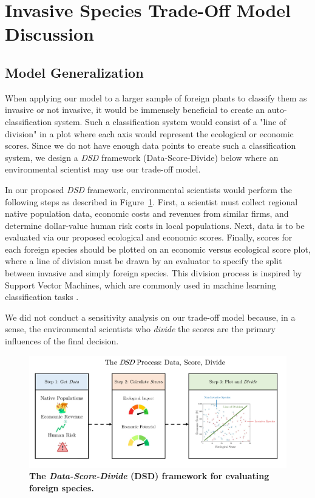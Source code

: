 \section{Invasive Species Trade-Off Model Discussion}

\subsection{Model Generalization}

When applying our model to a larger sample of foreign plants to classify them as invasive or not invasive, it would be immensely beneficial to create an auto-classification system. Such a classification system would consist of a "line of division" in a plot where each axis would represent the ecological or economic scores. Since we do not have enough data points to create such a classification system, we design a \textit{DSD} framework (Data-Score-Divide) below where an environmental scientist may use our trade-off model.

In our proposed \textit{DSD} framework, environmental scientists would perform the following steps as described in Figure~\ref{fig:dsdprocess}. First, a scientist must collect regional native population data, economic costs and revenues from similar firms, and determine dollar-value human risk costs in local populations. Next, data is to be evaluated via our proposed ecological and economic scores. Finally, scores for each foreign species should be plotted on an economic versus ecological score plot, where a line of division must be drawn by an evaluator to specify the split between invasive and simply foreign species. This division process is inspired by Support Vector Machines, which are commonly used in machine learning classification tasks \cite{ieeeSupportVector}.

We did not conduct a sensitivity analysis on our trade-off model because, in a sense, the environmental scientists who \textit{divide} the scores are the primary influences of the final decision.

\begin{figure}[h!]
\centering
    \includegraphics[scale=0.6]{figures/dsdprocess.pdf}
    \captionsetup{width=0.9\textwidth}
    \caption{\textbf{The \textit{Data-Score-Divide} (DSD) framework for evaluating foreign species.}}
    \label{fig:dsdprocess}
\end{figure}

